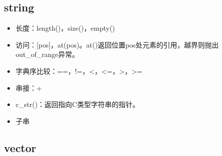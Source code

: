 \documentclass[letterpaper,10pt,english]{sphinxmanual}
\begin{document}
\subsection{string}
\label{\detokenize{cpp/19_stl:string}}
%
\begin{sphinxVerbatim}[commandchars=\\\{\}]
\end{sphinxVerbatim}
\begin{itemize}
\item {} 
长度：length()，size()，empty()

\item {} 
访问：{[}pos{]}，at(pos)。at()返回位置pos处元素的引用，越界则抛出out\_of\_range异常。

\item {} 
字典序比较：==，!=，\textless{}，\textless{}=，\textgreater{}，\textgreater{}=

\item {} 
串接：+

\item {} 
c\_str()：返回指向C类型字符串的指针。

\item {} 
子串

%
\begin{sphinxVerbatim}[commandchars=\\\{\}]
         
\end{sphinxVerbatim}

\end{itemize}


\subsection{vector}
\label{\detokenize{cpp/19_stl:vector}}
%
\begin{sphinxVerbatim}[commandchars=\\\{\}]
\end{sphinxVerbatim}
\end{document}
